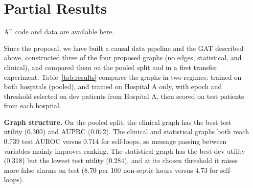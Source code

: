 \documentclass{article}
\begin{document}
\section{Partial Results}
\label{sec:results}
All code and data are available \href{https://github.com/chantal8le/CS224W_milestone.git}{here}.

Since the proposal, we have built a causal data pipeline and the GAT described above, constructed three of the four proposed graphs (no edges, statistical, and clinical), and compared them on the pooled split and in a first transfer experiment. Table~\ref{tab:results} compares the graphs in two regimes: trained on both hospitals (pooled), and trained on Hospital A only, with epoch and threshold selected on dev patients from Hospital A, then scored on test patients from each hospital.
 
\begin{table}[h]
\centering
\small
\caption{GAT with fixed hyperparameters under different graph topologies (single seed).}
\setlength{\tabcolsep}{4pt}
\label{tab:results}
\end{table}
 
\textbf{Graph structure.} On the pooled split, the clinical graph has the best test utility (0.300) and AUPRC (0.072). The clinical and statistical graphs both reach 0.739 test AUROC versus 0.714 for self-loops, so message passing between variables mainly improves ranking. The statistical graph has the best dev utility (0.318) but the lowest test utility (0.284), and at its chosen threshold it raises more false alarms on test (8.70 per 100 non-septic hours versus 4.73 for self-loops).
 
\end{document}
